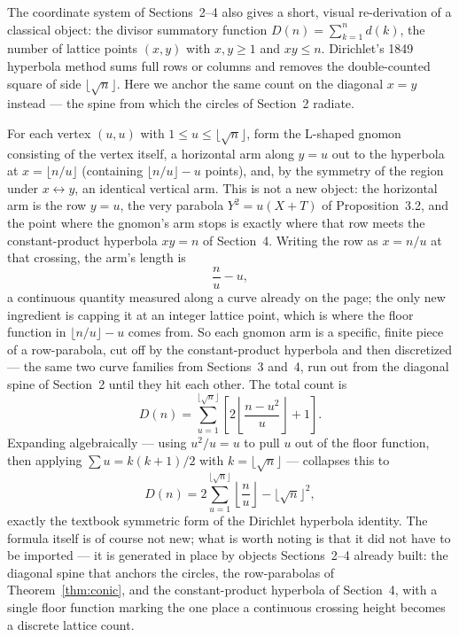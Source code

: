 \documentclass[11pt]{amsart}
\theoremstyle{remark}
\begin{document}
The coordinate system of Sections~2--4 also gives a short, visual re-derivation of a classical object: the divisor summatory function $D(n)=\sum_{k=1}^nd(k)$, the number of lattice points $(x,y)$ with $x,y\ge1$ and $xy\le n$. Dirichlet's 1849 hyperbola method sums full rows or columns and removes the double-counted square of side $\lfloor\sqrt n\rfloor$. Here we anchor the same count on the diagonal $x=y$ instead --- the spine from which the circles of Section~2 radiate.

For each vertex $(u,u)$ with $1\le u\le\lfloor\sqrt n\rfloor$, form the L-shaped gnomon consisting of the vertex itself, a horizontal arm along $y=u$ out to the hyperbola at $x=\lfloor n/u\rfloor$ (containing $\lfloor n/u\rfloor-u$ points), and, by the symmetry of the region under $x\leftrightarrow y$, an identical vertical arm. This is not a new object: the horizontal arm is the row $y=u$, the very parabola $Y^2=u(X+T)$ of Proposition~3.2, and the point where the gnomon's arm stops is exactly where that row meets the constant-product hyperbola $xy=n$ of Section~4. Writing the row as $x=n/u$ at that crossing, the arm's length is
\[
\frac nu-u,
\]
a continuous quantity measured along a curve already on the page; the only new ingredient is capping it at an integer lattice point, which is where the floor function in $\lfloor n/u\rfloor-u$ comes from. So each gnomon arm is a specific, finite piece of a row-parabola, cut off by the constant-product hyperbola and then discretized --- the same two curve families from Sections~3 and~4, run out from the diagonal spine of Section~2 until they hit each other. The total count is
\begin{equation}
D(n)=\sum_{u=1}^{\lfloor\sqrt n\rfloor}\left[2\left\lfloor\frac{n-u^2}u\right\rfloor+1\right]. \tag{5.1}
\end{equation}
Expanding algebraically --- using $u^2/u=u$ to pull $u$ out of the floor function, then applying $\sum u=k(k+1)/2$ with $k=\lfloor\sqrt n\rfloor$ --- collapses this to
\begin{equation}
D(n)=2\sum_{u=1}^{\lfloor\sqrt n\rfloor}\left\lfloor\frac nu\right\rfloor-\lfloor\sqrt n\rfloor^2, \tag{5.2}
\end{equation}
exactly the textbook symmetric form of the Dirichlet hyperbola identity. The formula itself is of course not new; what is worth noting is that it did not have to be imported --- it is generated in place by objects Sections~2--4 already built: the diagonal spine that anchors the circles, the row-parabolas of Theorem~\ref{thm:conic}, and the constant-product hyperbola of Section~4, with a single floor function marking the one place a continuous crossing height becomes a discrete lattice count.
\end{document}
